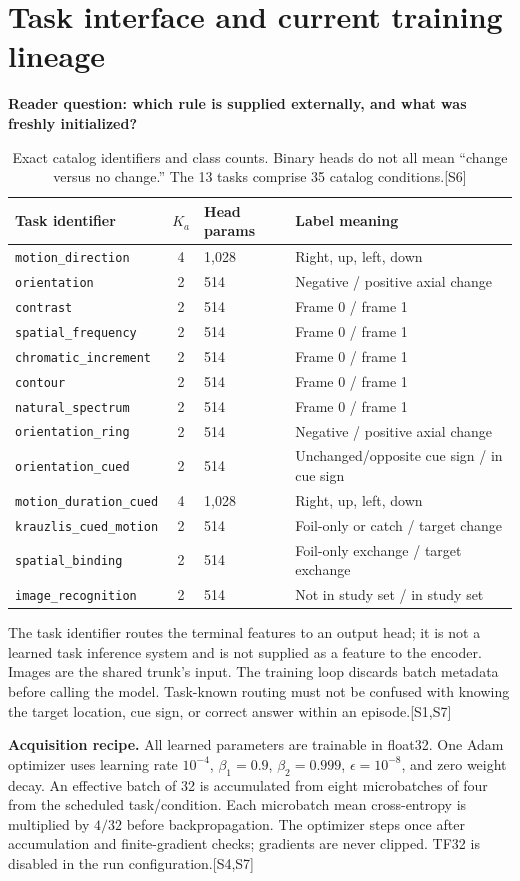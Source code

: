 \documentclass[10pt,letterpaper]{article}
\newcommand{\src}[1]{\textcolor{accent}{\textsf{[#1]}}}
\newcommand{\psection}[1]{\clearpage\section{#1}}
\begin{document}
\psection{Task interface and current training lineage}
\textbf{Reader question: which rule is supplied externally, and what was freshly initialized?}
\begin{table}[h!]
\centering\small
\begin{tabularx}{\linewidth}{@{}lclX@{}}\toprule
Task identifier & $K_a$ & Head params & Label meaning\\\midrule
\texttt{motion\_direction} &4&1,028& Right, up, left, down\\
\texttt{orientation} &2&514& Negative / positive axial change\\
\texttt{contrast} &2&514& Frame 0 / frame 1\\
\texttt{spatial\_frequency} &2&514& Frame 0 / frame 1\\
\texttt{chromatic\_increment} &2&514& Frame 0 / frame 1\\
\texttt{contour} &2&514& Frame 0 / frame 1\\
\texttt{natural\_spectrum} &2&514& Frame 0 / frame 1\\
\texttt{orientation\_ring} &2&514& Negative / positive axial change\\
\texttt{orientation\_cued} &2&514& Unchanged/opposite cue sign / in cue sign\\
\texttt{motion\_duration\_cued} &4&1,028& Right, up, left, down\\
\texttt{krauzlis\_cued\_motion} &2&514& Foil-only or catch / target change\\
\texttt{spatial\_binding} &2&514& Foil-only exchange / target exchange\\
\texttt{image\_recognition} &2&514& Not in study set / in study set\\\bottomrule
\end{tabularx}
\caption{Exact catalog identifiers and class counts. Binary heads do not all mean ``change versus no change.'' The 13 tasks comprise 35 catalog conditions.\src{S6}}
\end{table}
The task identifier routes the terminal features to an output head; it is not a learned task inference system and is not supplied as a feature to the encoder. Images are the shared trunk's input. The training loop discards batch metadata before calling the model. Task-known routing must not be confused with knowing the target location, cue sign, or correct answer within an episode.\src{S1,S7}

\textbf{Acquisition recipe.} All learned parameters are trainable in float32. One Adam optimizer \cite{adam} uses learning rate $10^{-4}$, $\beta_1=0.9$, $\beta_2=0.999$, $\epsilon=10^{-8}$, and zero weight decay. An effective batch of 32 is accumulated from eight microbatches of four from the scheduled task/condition. Each microbatch mean cross-entropy is multiplied by $4/32$ before backpropagation. The optimizer steps once after accumulation and finite-gradient checks; gradients are never clipped. TF32 is disabled in the run configuration.\src{S4,S7}
\end{document}
